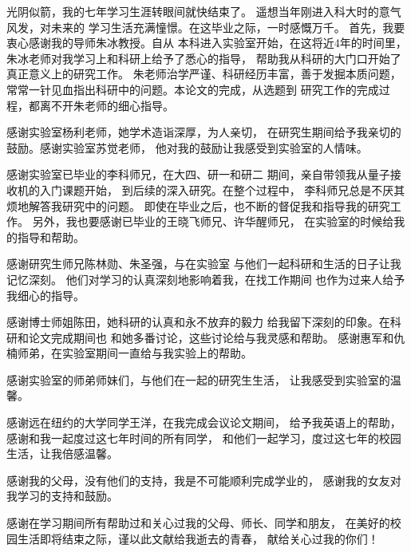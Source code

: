 \begin{acknowledgements}
光阴似箭，我的七年学习生涯转眼间就快结束了。
遥想当年刚进入科大时的意气风发，对未来的
学习生活充满憧憬。在这毕业之际，一时感慨万千。
首先，我要衷心感谢我的导师朱冰教授。自从
本科进入实验室开始，在这将近4年的时间里，
朱冰老师对我学习上和科研上给予了悉心的指导，
帮助我从科研的大门口开始了真正意义上的研究工作。
朱老师治学严谨、科研经历丰富，善于发掘本质问题，
常常一针见血指出科研中的问题。本论文的完成，从选题到
研究工作的完成过程，都离不开朱老师的细心指导。

感谢实验室杨利老师，她学术造诣深厚，为人亲切，
在研究生期间给予我亲切的鼓励。感谢实验室苏觉老师，
他对我的鼓励让我感受到实验室的人情味。

感谢实验室已毕业的李科师兄，在大四、研一和研二
期间，亲自带领我从量子接收机的入门课题开始，
到后续的深入研究。在整个过程中，
李科师兄总是不厌其烦地解答我研究中的问题。
即使在毕业之后，也不断的督促我和指导我的研究工作。
另外，我也要感谢已毕业的王晓飞师兄、许华醒师兄，
在实验室的时候给我的指导和帮助。

感谢研究生师兄陈林勋、朱圣强，与在实验室
与他们一起科研和生活的日子让我记忆深刻。
他们对学习的认真深刻地影响着我，在找工作期间
也作为过来人给予我细心的指导。

感谢博士师姐陈田，她科研的认真和永不放弃的毅力
给我留下深刻的印象。在科研和论文完成期间也
和她多番讨论，这些讨论给与我灵感和帮助。
感谢惠军和仇楠师弟，在实验室期间一直给与我实验上的帮助。

感谢实验室的师弟师妹们，与他们在一起的研究生生活，
让我感受到实验室的温馨。

感谢远在纽约的大学同学王洋，在我完成会议论文期间，
给予我英语上的帮助，感谢和我一起度过这七年时间的所有同学，
和他们一起学习，度过这七年的校园生活，让我倍感温馨。

感谢我的父母，没有他们的支持，我是不可能顺利完成学业的，
感谢我的女友对我学习的支持和鼓励。

感谢在学习期间所有帮助过和关心过我的父母、师长、同学和朋友，
在美好的校园生活即将结束之际，谨以此文献给我逝去的青春，
献给关心过我的你们！

\end{acknowledgements}
